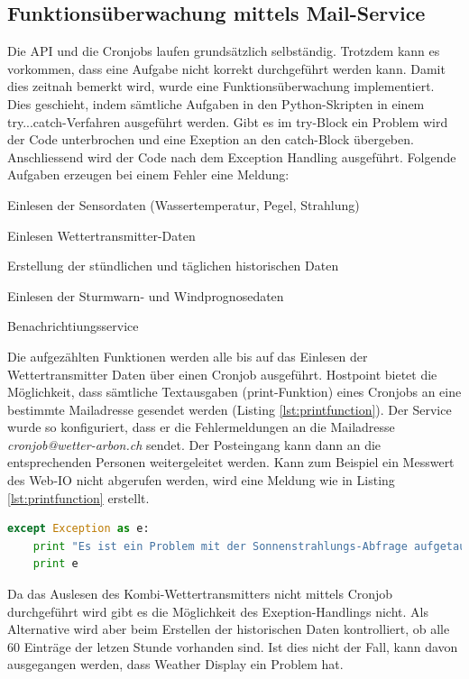 \subsection{Funktionsüberwachung mittels Mail-Service}\label{kap:Funktionsüberwachung}
Die API und die Cronjobs laufen grundsätzlich selbständig. Trotzdem kann es vorkommen, dass eine Aufgabe nicht korrekt durchgeführt werden kann. Damit dies zeitnah bemerkt wird, wurde eine Funktionsüberwachung implementiert. Dies geschieht, indem sämtliche Aufgaben in den Python-Skripten in einem try...catch-Verfahren ausgeführt werden. Gibt es im try-Block ein Problem wird der Code unterbrochen und eine Exeption an den catch-Block übergeben. Anschliessend wird der Code nach dem Exception Handling ausgeführt\cite{ThePythonTutorial8.ErrorsAndExceptions:Python}. Folgende Aufgaben erzeugen bei einem Fehler eine Meldung:

\begin{itemize*}
\item Einlesen der Sensordaten (Wassertemperatur, Pegel, Strahlung)
\item Einlesen Wettertransmitter-Daten
\item Erstellung der stündlichen und täglichen historischen Daten
\item Einlesen der Sturmwarn- und Windprognosedaten
\item Benachrichtiungsservice
\end{itemize*}

\noindent
Die aufgezählten Funktionen werden alle bis auf das Einlesen der Wettertransmitter Daten über einen Cronjob ausgeführt. Hostpoint bietet die Möglichkeit, dass sämtliche Textausgaben (print-Funktion) eines Cronjobs an eine bestimmte Mailadresse gesendet werden (Listing \ref{lst:printfunction}). Der Service wurde so konfiguriert, dass er die Fehlermeldungen an die Mailadresse \emph{cronjob@wetter-arbon.ch} sendet. Der Posteingang kann dann an die entsprechenden Personen weitergeleitet werden. Kann zum Beispiel ein Messwert des Web-IO nicht abgerufen werden, wird eine Meldung wie in Listing\,\ref{lst:printfunction} erstellt.

\vspace{3mm}
\begin{lstlisting}[label=lst:printfunction,caption=Beispiel eines Exeption-Handlings, language=Python, style=py]
except Exception as e:
    print "Es ist ein Problem mit der Sonnenstrahlungs-Abfrage aufgetaucht: "
    print e
\end{lstlisting}
\vspace{3mm}

\noindent
Da das Auslesen des Kombi-Wettertransmitters nicht mittels Cronjob durchgeführt wird gibt es die Möglichkeit des Exeption-Handlings nicht. Als Alternative wird aber beim Erstellen der historischen Daten kontrolliert, ob alle 60 Einträge der letzen Stunde vorhanden sind. Ist dies nicht der Fall, kann davon ausgegangen werden, dass Weather Display ein Problem hat.
